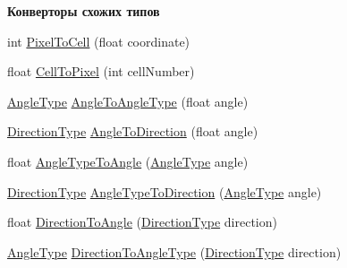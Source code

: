 \begin{Indent}\textbf{ Конверторы схожих типов}\par
\begin{DoxyCompactItemize}
\item 
int \hyperlink{namespacertm_a390df6b8bc4a01befd946155150db744}{Pixel\+To\+Cell} (float coordinate)
\item 
float \hyperlink{namespacertm_af8d63f917ae1055a5766a0ba19542913}{Cell\+To\+Pixel} (int cell\+Number)
\item 
\hyperlink{namespacertm_a69dc82b16a0148c10962caa83d930f89}{Angle\+Type} \hyperlink{namespacertm_aea5ae6d368199e41611725e0db13c5c3}{Angle\+To\+Angle\+Type} (float angle)
\item 
\hyperlink{namespacertm_a57b216f3aeb45041f3461bab08bc3aeb}{Direction\+Type} \hyperlink{namespacertm_ac81b2243a62081233f7b549248b5a145}{Angle\+To\+Direction} (float angle)
\item 
float \hyperlink{namespacertm_ad13b014bcdda27e0ff2fb23f265e29e4}{Angle\+Type\+To\+Angle} (\hyperlink{namespacertm_a69dc82b16a0148c10962caa83d930f89}{Angle\+Type} angle)
\item 
\hyperlink{namespacertm_a57b216f3aeb45041f3461bab08bc3aeb}{Direction\+Type} \hyperlink{namespacertm_abeb9a79e27bc0c8c4c3e6cd9ec802627}{Angle\+Type\+To\+Direction} (\hyperlink{namespacertm_a69dc82b16a0148c10962caa83d930f89}{Angle\+Type} angle)
\item 
float \hyperlink{namespacertm_a173759dd130d0f30d1f90fba11506bd6}{Direction\+To\+Angle} (\hyperlink{namespacertm_a57b216f3aeb45041f3461bab08bc3aeb}{Direction\+Type} direction)
\item 
\hyperlink{namespacertm_a69dc82b16a0148c10962caa83d930f89}{Angle\+Type} \hyperlink{namespacertm_aa37fca29e3577b3389a9e8eb40d20d14}{Direction\+To\+Angle\+Type} (\hyperlink{namespacertm_a57b216f3aeb45041f3461bab08bc3aeb}{Direction\+Type} direction)
\end{DoxyCompactItemize}
\end{Indent}
